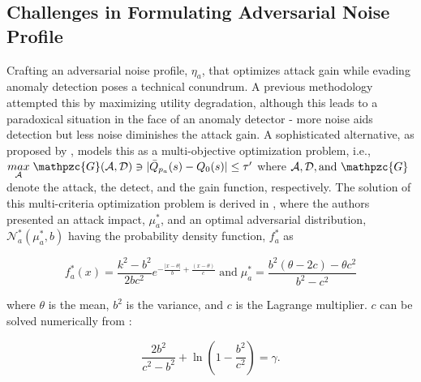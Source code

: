 \subsection{Challenges in Formulating Adversarial Noise Profile}
\label{noiseProfile} Crafting an adversarial noise profile, $\mathcal{\eta}_a$, that optimizes attack gain while evading anomaly detection poses a technical conundrum. A previous methodology \cite{fang2020local} attempted this by maximizing utility degradation, although this leads to a paradoxical situation in the face of an anomaly detector - more noise aids detection but less noise diminishes the attack gain. A sophisticated alternative, as proposed by \cite{giraldo2020adversarial}, models this as a multi-objective optimization problem, i.e., $\underset{\mathcal{A}}{max}\;\mathpzc{G}(\mathcal{A}, \mathcal{D}) \ni |\bar{Q}_{p_{a}}(s)-Q_{0}(s)|\leq \tau'$ where $\mathcal{A}, \mathcal{D}, \text{and } \mathpzc{G}$ denote the attack, the detect, and the gain function, respectively. The solution of this multi-criteria optimization problem is derived in \cite{giraldo2020adversarial}, where the authors presented an attack impact, $\mu^*_a$, and an optimal adversarial distribution, $\mathcal{N}_a^*(\mu_a^*, b)$ having the probability density function, $f^*_a$ as

\begin{equation}
    f_a^*(x) = \frac{k^2 - b^2}{2bc^2}e^{-\frac{|x-\theta|}{b} + \frac{(x-\theta)}{c}} \;\text{and}\; \mu_a^* = \frac{b^2(\theta-2c)-\theta c^2}{b^2 - c^2}
    \label{eqn:attackDist}
\end{equation}

where $\theta$ is the mean, $b^2$ is the variance, and $c$ is the Lagrange multiplier. $c$ can be solved numerically from \cite{giraldo2020adversarial}: 

\begin{equation}
    \frac{2b^2}{c^2 - b^2} + \ln{(1-\frac{b^2}{c^2})}=\gamma.
    \label{eqn:c}
\end{equation} 

